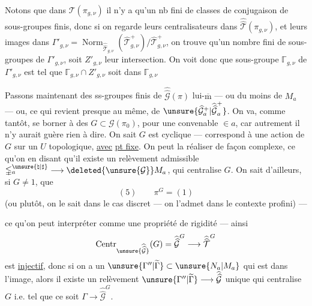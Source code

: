 Notons que dans $\mathcal T(\pi_{g,\nu})$ il n'y a
qu'un nb fini de classes de conjugaison
de sous-groupes finis, donc si on
regarde leurs centralisateurs  dans
$\widehat{\widehat{\mathcal T}}(\pi_{g,\nu})$, et leurs images dans
$\Gamma'_{g,\nu}=\operatorname{Norm}_{\widehat{\widehat{\mathcal T}}_{g,\nu}}(\widehat{\mathcal T}^{+}_{g,\nu})/\widehat{\mathcal T}^{+}_{g,\nu}$, on 
trouve qu'un nombre fini de sous-groupes
de $\Gamma'_{g,\nu}$, soit $Z'_{g,\nu}$ leur intersection.
On voit donc que  sous-groupe $\mathbb{\Gamma}_{g,\nu}$
de $\Gamma'_{g,\nu}$ est tel que $\mathbb{\Gamma}_{g,\nu}\cap Z'_{g,\nu}$ soit
 dans $\mathbb{\Gamma}_{g,\nu}$


Passons maintenant  des ss-groupes
finis de $\widehat{\widehat{\mathcal G}}(\pi)$ lui-$\overline{\mathrm m}$ --- ou du moins
de $M_a$ --- ou, ce qui revient presque au
même, de $\unsure{\widehat{\mathcal G}^{+}_a|\widehat{\widehat{\mathcal G}}^{+}_a}$. On va, comme
tantôt, se borner à des $G\subset\mathcal G(\pi_0)$,
pour une  convenable $\in a$,
car autrement il n'y aurait guère rien à
dire. On sait  $G$ est
cyclique ---  correspond à une action
de $G$ sur un $U$ topologique, \uline{avec}
\uline{pt fixe}. On peut la réaliser de
façon complexe, ce qu'on  en
disant qu'il existe un relèvement
admissible $\mathbb{\Gamma}_a^{\unsure{\natural|\sharp}}\longrightarrow\deleted{\unsure{\mathcal G}} M_a$, qui
centralise $G$. On sait d'ailleurs, si
$G\ne1$, que \deleted{$\unsure{\pi}$}
\[
(5)\qquad \pi^G=(1)
\]
(ou plutôt, on le sait dans le cas discret ---
on l'admet dans le contexte profini) ---


ce qu'on peut  interpréter comme une propriété de rigidité --- ainsi
\[
\operatorname{Centr}_{\unsure{\widehat{\widehat{\mathcal G}}}}(G)
=\widehat{\widehat{\mathcal G}}^{G}
\longrightarrow\widehat{\widehat{\mathcal T}}^{G}
\]
est \uline{injectif}, donc si on a un $\unsure{\Gamma''|\widetilde{\Gamma}}\subset\unsure{N_a|M_a}$ qui est dans l'image, alors il existe un relèvement $\unsure{\Gamma''|\widetilde{\Gamma}}\longrightarrow\widehat{\widehat{\mathcal G}}$ unique qui centralise $G$ i.e. tel que ce soit $\Gamma\longrightarrow\widehat{\widehat{\mathcal G}}^{G}$.

